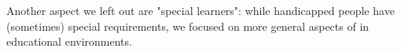 Another aspect we left out are "special learners": while handicapped people have (sometimes) special requirements, we focused on more general aspects of \AR in educational environments. \\
% 
% 

